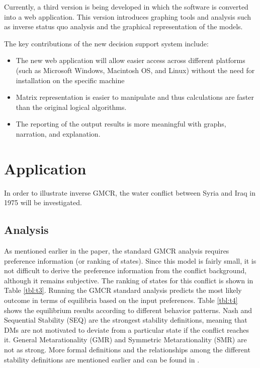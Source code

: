 \documentclass[letterpaper,12pt,titlepage,oneside,final]{book}
\begin{document}
Currently, a third version is being developed in which the software is converted into a web application. This version  introduces graphing tools and analysis such as inverse status quo analysis and the graphical representation of the models. 

The key contributions of the new decision support system include:

\begin{itemize}
\item The new web application will allow easier access across different platforms (such as Microsoft Windows, Macintosh OS, and Linux) without the need for installation on the specific machine
\item Matrix representation is easier to manipulate and thus calculations are faster than the original logical algorithms.
\item The reporting of the output results is more meaningful with  graphs, narration, and explanation.
\end{itemize}


\section{Application}
In order to illustrate inverse GMCR, the water conflict between Syria and Iraq in 1975 will be investigated. 

\subsection{Analysis}
As mentioned earlier in the paper, the standard GMCR analysis requires preference information (or ranking of states). Since this model is fairly small, it is not difficult to derive the preference information from the conflict background, although it remains subjective. The ranking of states for this conflict is shown in Table \ref{tbl:t3}. Running the GMCR standard analysis  predicts the most likely outcome in terms of equilibria based on the input preferences. Table \ref{tbl:t4} shows the equilibrium results according to different behavior patterns. Nash and Sequential Stability (SEQ) are the strongest stability definitions, meaning that DMs are not motivated to deviate from a particular state if the conflict reaches it. General Metarationality (GMR) and Symmetric Metarationality (SMR) are not as strong. More formal definitions and the relationships among the different stability definitions are mentioned earlier and can be found in \cite{Fang1989}.
\end{document}
